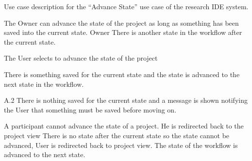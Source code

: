 \documentclass[document.tex]{subfiles}
\begin{document}
\begin{table}
  \centering
  \caption{Use case description for the ``Advance State'' use case of the research IDE system.}
  \label{tbl:use-case-advance-state}

  \begin{usecase}
    The Owner can advance the state of the project as long as something has been saved into the current state.
    Owner
    There is another state in the workflow after the current state.
    \ucnormal
    \begin{ucenum}
      \item The User selects to advance the state of the project
      \item There is something saved for the current state and the state is advanced to the next state in the workflow.
    \end{ucenum}
    \begin{ucenum}
      \item [A.2] There is nothing saved for the current state and a message is shown notifying the User that something must be saved before moving on.
    \end{ucenum}
    A participant cannot advance the state of a project. He is redirected back to the project view
    There is no state after the current state so the state cannot be advanced, User is redirected back to project view.
    The state of the workflow is advanced to the next state.
  \end{usecase}
\end{table}
\end{document}
